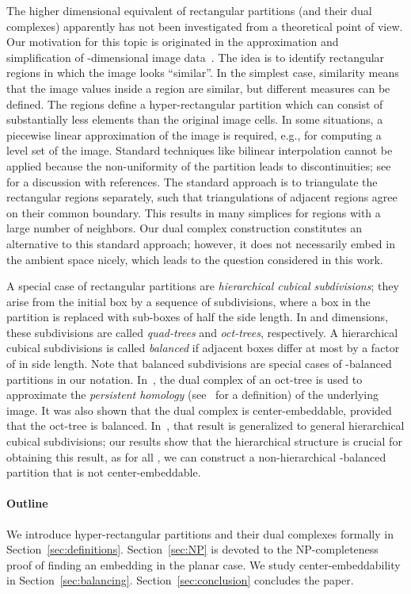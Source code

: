 \documentclass[12pt]{article}
\begin{document}
The higher dimensional equivalent of rectangular partitions (and their dual complexes) apparently has not been investigated 
from a theoretical point of view.
Our motivation for this topic is originated in the approximation and simplification of -dimensional image data~\cite{bek-computing}. 
The idea is to identify rectangular regions in which the image looks ``similar''. In the simplest case, similarity means that the
image values inside a region are similar, but different measures can be defined. The regions define a hyper-rectangular partition
which can consist of substantially less elements than the original  image cells. 
In some situations, a piecewise linear approximation of the image is required, e.g., for computing a level set of the image.
Standard techniques like bilinear interpolation cannot be applied because the non-uniformity of the partition leads to discontinuities;
see~\cite{wf-diamond} for a discussion with references.
The standard approach is to triangulate
the rectangular regions separately, such that triangulations of adjacent regions agree on their common boundary.
This results in many simplices for regions with a large number of neighbors.
Our dual complex construction constitutes an alternative to this standard approach; however,
it does not necessarily embed in the ambient space nicely, which leads to the question considered in this work.

A special case of rectangular partitions are \emph{hierarchical cubical subdivisions};
they arise from the initial box by a sequence of subdivisions, where a box in the partition is replaced
with  sub-boxes of half the side length. In  and  dimensions, these subdivisions are called \emph{quad-trees}
and \emph{oct-trees}, respectively. A hierarchical cubical subdivisions is called \emph{balanced}
if adjacent boxes differ at most by a factor of  in side length.
Note that balanced subdivisions are special cases of -balanced partitions in our notation.
In~\cite{bek-computing},  the dual complex of an oct-tree is used to approximate the \emph{persistent homology} 
(see~\cite{eh-computational} for a definition) of the underlying image. 
It was also shown that the dual complex is center-embeddable, provided that the oct-tree is balanced.
In~\cite{ek-freudenthal}, that result is generalized to general hierarchical cubical subdivisions;
our results show that the hierarchical structure is crucial for obtaining this result,
as for all , we can construct a non-hierarchical -balanced partition that is not center-embeddable.

\paragraph{Outline}
We introduce hyper-rectangular partitions and their dual complexes formally in Section~\ref{sec:definitions}.
Section~\ref{sec:NP} is devoted to the NP-completeness proof of finding an embedding in the planar case.
We study center-embeddability in Section~\ref{sec:balancing}. Section~\ref{sec:conclusion} concludes
the paper.
\end{document}
